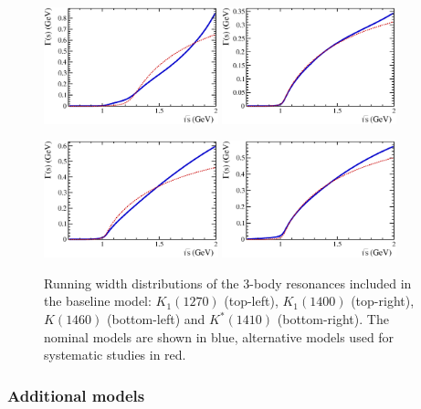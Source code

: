 \begin{figure}[h]
\centering
\includegraphics[height=!,width=0.45\textwidth]{figs/Lineshapes/rw_K1_1270.eps}
\includegraphics[height=!,width=0.45\textwidth]{figs/Lineshapes/rw_K1_1400.eps}

\includegraphics[height=!,width=0.45\textwidth]{figs/Lineshapes/rw_K.eps}
\includegraphics[height=!,width=0.45\textwidth]{figs/Lineshapes/rw_Ks.eps}
\caption{Running width distributions of the 3-body resonances included in the baseline model:
$K_1(1270)$ (top-left), $K_1(1400)$ (top-right), $K(1460)$ (bottom-left)  and $K^*(1410)$ (bottom-right).
The nominal models are shown in blue, alternative models used for systematic studies in red.
}
\label{fig:rw}
\end{figure}

\subsubsection*{Additional models}

